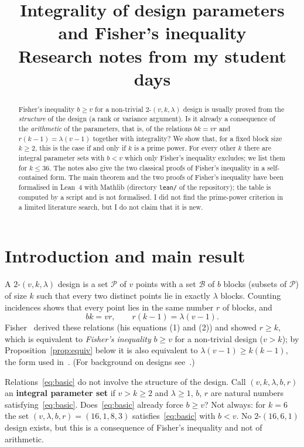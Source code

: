 \documentclass[11pt,a4paper]{article}
\title{Integrality of design parameters and Fisher's inequality\\[2pt]
  \large Research notes from my student days}
\author{}
\date{}
\theoremstyle{definition}
\newcommand{\PP}{\mathcal{P}}
\newcommand{\BB}{\mathcal{B}}
\begin{document}
\maketitle

\begin{abstract}
\noindent
Fisher's inequality $b\ge v$ for a non-trivial $2$-$(v,k,\lambda)$ design is usually proved from the \emph{structure} of the design (a rank or variance argument).
Is it already a consequence of the \emph{arithmetic} of the parameters, that is, of the relations $bk=vr$ and $r(k-1)=\lambda(v-1)$ together with integrality?
We show that, for a fixed block size $k\ge2$, this is the case if and only if $k$ is a prime power.
For every other $k$ there are integral parameter sets with $b<v$ which only Fisher's inequality excludes; we list them for $k\le36$.
The notes also give the two classical proofs of Fisher's inequality in a self-contained form.
The main theorem and the two proofs of Fisher's inequality have been formalised in Lean~4 with Mathlib (directory \texttt{lean/} of the repository); the table is computed by a script and is not formalised.
I did not find the prime-power criterion in a limited literature search, but I do not claim that it is new.
\end{abstract}

\section{Introduction and main result}
A $2$-$(v,k,\lambda)$ design is a set $\PP$ of $v$ points with a set $\BB$ of $b$ blocks (subsets of $\PP$) of size $k$ such that every two distinct points lie in exactly $\lambda$ blocks.
Counting incidences shows that every point lies in the same number $r$ of blocks, and
\begin{equation}\label{eq:basic}
  bk=vr,\qquad r(k-1)=\lambda(v-1).
\end{equation}
Fisher~\cite{fisher1940} derived these relations (his equations (1) and (2)) and showed $r\ge k$, which is equivalent to \emph{Fisher's inequality} $b\ge v$ for a non-trivial design ($v>k$); by Proposition~\ref{prop:equiv} below it is also equivalent to $\lambda(v-1)\ge k(k-1)$, the form used in~\cite{horsley}.
(For background on designs see~\cite{assmus}.)

Relations~\eqref{eq:basic} do not involve the structure of the design.
Call $(v,k,\lambda,b,r)$ an \textbf{integral parameter set} if $v>k\ge2$ and $\lambda\ge1$, $b$, $r$ are natural numbers satisfying~\eqref{eq:basic}.
Does~\eqref{eq:basic} already force $b\ge v$?
Not always: for $k=6$ the set $(v,\lambda,b,r)=(16,1,8,3)$ satisfies~\eqref{eq:basic} with $b<v$.
No $2$-$(16,6,1)$ design exists, but this is a consequence of Fisher's inequality and not of arithmetic.
\end{document}
